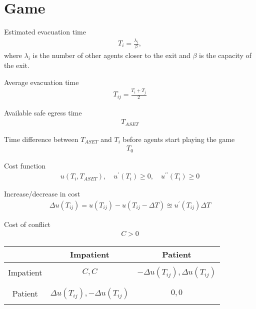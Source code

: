 \section{Game}

Estimated evacuation time
\begin{align}
T_{i} = \frac{\lambda_{i}}{\beta},
\end{align}
where $ \lambda_{i} $ is the number of other agents closer to the exit and $ \beta $
is the capacity of the exit.

Average evacuation time
\begin{align}
T_{ij} = \frac{T_{i} + T_{j}}{2}
\end{align}

Available safe egress time
\begin{align}
T_{ASET}
\end{align}

Time difference between $ T_{ASET} $ and $ T_{i} $ before agents start playing the game
\begin{align}
T_{0}
\end{align}

Cost function
\begin{align}
u(T_{i}, T_{ASET}), \quad u^{\prime}(T_{i}) \geq 0, \quad u^{\prime\prime}(T_{i}) \geq 0
\end{align}

Increase/decrease in cost
\begin{align}
\Delta u(T_{ij}) = u(T_{ij}) - u(T_{ij} - \Delta T) \approxeq u^{\prime}(T_{ij}) \Delta T
\end{align}

Cost of conflict 
\begin{align}
C > 0
\end{align}




\begin{tabularx}{1.0\linewidth}{ c | C | C }
& Impatient & Patient \\
\hline
&& \\
Impatient & $ C, C $ & $ -\Delta u(T_{ij}), \Delta u(T_{ij}) $ \\
&& \\
\hline
&& \\
Patient & $ \Delta u(T_{ij}), -\Delta u(T_{ij}) $ & $ 0, 0 $ \\
&& \\
\end{tabularx}

\vspace{1.0cm}


